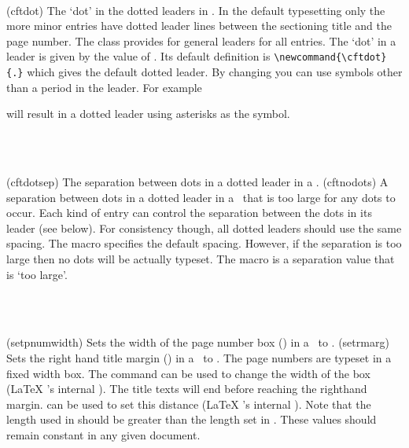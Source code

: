 \begin{syntax}
 \cmd{\cftdot} \\
\end{syntax}
\glossary(cftdot)%
  {}%
 {The `dot' in the dotted leaders in \listofx.}
  In the default \toc{} typesetting only the more minor entries have dotted
 leader lines between the sectioning title and the page number. The
 class provides for general leaders for all entries.
 The `dot' in a leader is given by the value of \cmd{\cftdot}. Its default
 definition is \verb?\newcommand{\cftdot}{.}? which gives the default
 dotted leader. By changing \cmd{\cftdot} you can use symbols other than
 a period in the leader. For example 
 \begin{lcode}
 \renewcommand{\cftdot}{\ensuremath{\ast}}
 \end{lcode}
 will result in a dotted leader using asterisks as the symbol.

\begin{syntax}
 \cmd{\cftdotsep} \\
 \cmd{\cftnodots} \\
\end{syntax}
\glossary(cftdotsep)%
  {}%
  {The separation between dots in a dotted leader in a \listofx.}
\glossary(cftnodots)%
  {}%
  {A separation between dots in a dotted leader in a \listofx\
   that is too large for any dots to occur.}
    Each kind of entry can control the separation between the dots
 in its leader (see below). For consistency though, all dotted leaders
 should use the same spacing. The macro \cmd{\cftdotsep} specifies the
 default spacing. 
 However, if the separation is too large
 then no dots will be actually typeset. The macro \cmd{\cftnodots} is
 a separation value that is `too large'. 

\begin{syntax}
 \cmd{\setpnumwidth} \\
 \cmd{\setrmarg}\marg{length} \\
\end{syntax}
\glossary(setpnumwidth)%
  {}%
  {Sets the width of the page number box () in a \listofx\ to 
   \meta{length}.}
\glossary(setrmarg)%
  {}%
  {Sets the right hand title margin () in a \listofx\ to
   \meta{length}.}
 The page numbers are typeset in a fixed width box. The command
 \cmd{\setpnumwidth} can be used to change the width
 of the box (LaTeX 's internal \cmd{\@pnumwidth}). 
 The title texts will end before reaching the righthand 
margin.
 \cmd{\setrmarg} can be used to set this distance 
 (LaTeX 's internal \cmd{\@tocrmarg}).
 Note that the length used in \cmd{\setrmarg} should be greater
 than the length set in \cmd{\setpnumwidth}. These values should remain
 constant in any given document.


